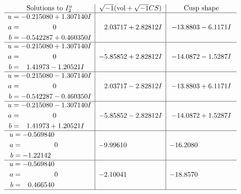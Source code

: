\documentclass[1p]{elsarticle_modified}
\theoremstyle{definition}
\newcommand{\I}{\sqrt{-1}}
\begin{document}
$$\begin{array}{c|c|c}  
\text{Solutions to }I^u_{2}& \I (\text{vol} + \sqrt{-1}CS) & \text{Cusp shape}\\
 \hline 
\begin{aligned}
u &= -0.215080 + 1.307140 I \\
a &= \phantom{-0.000000 } 0 \\
b &= -0.542287 + 0.460350 I\end{aligned}
 & \phantom{-}2.03717 + 2.82812 I & -13.8803 - 6.1171 I \\ \hline\begin{aligned}
u &= -0.215080 + 1.307140 I \\
a &= \phantom{-0.000000 } 0 \\
b &= \phantom{-}1.41973 - 1.20521 I\end{aligned}
 & -5.85852 + 2.82812 I & -14.0872 - 1.5287 I \\ \hline\begin{aligned}
u &= -0.215080 - 1.307140 I \\
a &= \phantom{-0.000000 } 0 \\
b &= -0.542287 - 0.460350 I\end{aligned}
 & \phantom{-}2.03717 - 2.82812 I & -13.8803 + 6.1171 I \\ \hline\begin{aligned}
u &= -0.215080 - 1.307140 I \\
a &= \phantom{-0.000000 } 0 \\
b &= \phantom{-}1.41973 + 1.20521 I\end{aligned}
 & -5.85852 - 2.82812 I & -14.0872 + 1.5287 I \\ \hline\begin{aligned}
u &= -0.569840\phantom{ +0.000000I} \\
a &= \phantom{-0.000000 } 0 \\
b &= -1.22142\phantom{ +0.000000I}\end{aligned}
 & -9.99610\phantom{ +0.000000I} & -16.2080\phantom{ +0.000000I} \\ \hline\begin{aligned}
u &= -0.569840\phantom{ +0.000000I} \\
a &= \phantom{-0.000000 } 0 \\
b &= \phantom{-}0.466540\phantom{ +0.000000I}\end{aligned}
 & -2.10041\phantom{ +0.000000I} & -18.8570\phantom{ +0.000000I}\\
 \hline 
 \end{array}$$\newpage
\end{document}
